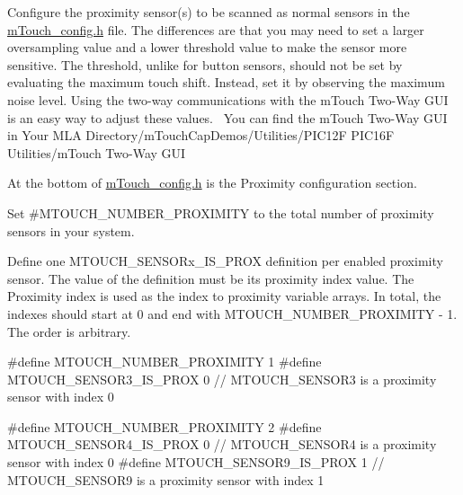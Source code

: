\begin{DoxyEnumerate}
\item Configure the proximity sensor(s) to be scanned as normal sensors in the \hyperlink{m_touch__config_8h}{m\+Touch\+\_\+config.\+h} file. The differences are that you may need to set a larger oversampling value and a lower threshold value to make the sensor more sensitive. The threshold, unlike for button sensors, should not be set by evaluating the maximum touch shift. Instead, set it by observing the maximum noise level. Using the two-\/way communications with the m\+Touch Two-\/\+Way G\+U\+I is an easy way to adjust these values.~\newline
 You can find the m\+Touch Two-\/\+Way G\+U\+I in {\ttfamily Your M\+L\+A Directory/m\+Touch\+Cap\+Demos/\+Utilities/\+P\+I\+C12\+F P\+I\+C16\+F Utilities/m\+Touch Two-\/\+Way G\+U\+I} 
\item At the bottom of \hyperlink{m_touch__config_8h}{m\+Touch\+\_\+config.\+h} is the \textquotesingle{}Proximity\textquotesingle{} configuration section. 
\begin{DoxyEnumerate}
\item Set \#\+M\+T\+O\+U\+C\+H\+\_\+\+N\+U\+M\+B\+E\+R\+\_\+\+P\+R\+O\+X\+I\+M\+I\+T\+Y to the total number of proximity sensors in your system. 
\item Define one M\+T\+O\+U\+C\+H\+\_\+\+S\+E\+N\+S\+O\+Rx\+\_\+\+I\+S\+\_\+\+P\+R\+O\+X definition per enabled proximity sensor. The value of the definition must be its \textquotesingle{}proximity index\textquotesingle{} value. The \textquotesingle{}Proximity index\textquotesingle{} is used as the index to proximity variable arrays. In total, the indexes should start at 0 and end with M\+T\+O\+U\+C\+H\+\_\+\+N\+U\+M\+B\+E\+R\+\_\+\+P\+R\+O\+X\+I\+M\+I\+T\+Y -\/ 1. The order is arbitrary. 
\begin{DoxyCode}
\textcolor{preprocessor}{#define MTOUCH\_NUMBER\_PROXIMITY     1          }
\textcolor{preprocessor}{#define MTOUCH\_SENSOR3\_IS\_PROX      0   // MTOUCH\_SENSOR3 is a proximity sensor with index 0   }
\end{DoxyCode}
 
\begin{DoxyCode}
\textcolor{preprocessor}{#define MTOUCH\_NUMBER\_PROXIMITY     2          }
\textcolor{preprocessor}{#define MTOUCH\_SENSOR4\_IS\_PROX      0   // MTOUCH\_SENSOR4 is a proximity sensor with index 0          }
\textcolor{preprocessor}{#define MTOUCH\_SENSOR9\_IS\_PROX      1   // MTOUCH\_SENSOR9 is a proximity sensor with index 1}
\end{DoxyCode}
 

\end{DoxyEnumerate}
\end{DoxyEnumerate}
